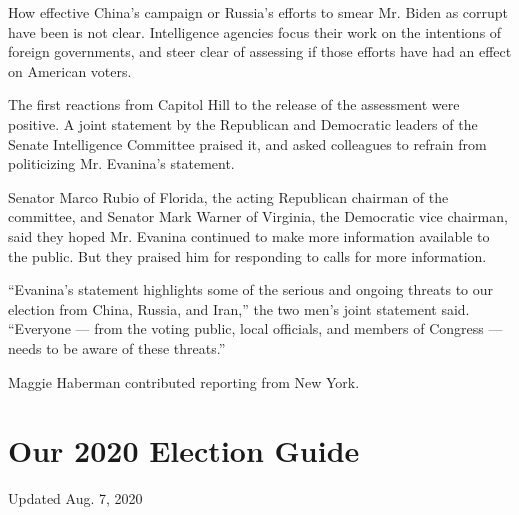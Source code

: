 How effective China's campaign or Russia's efforts to smear Mr. Biden as
corrupt have been is not clear. Intelligence agencies focus their work
on the intentions of foreign governments, and steer clear of assessing
if those efforts have had an effect on American voters.

The first reactions from Capitol Hill to the release of the assessment
were positive. A joint statement by the Republican and Democratic
leaders of the Senate Intelligence Committee praised it, and asked
colleagues to refrain from politicizing Mr. Evanina's statement.

Senator Marco Rubio of Florida, the acting Republican chairman of the
committee, and Senator Mark Warner of Virginia, the Democratic vice
chairman, said they hoped Mr. Evanina continued to make more information
available to the public. But they praised him for responding to calls
for more information.

``Evanina's statement highlights some of the serious and ongoing threats
to our election from China, Russia, and Iran,'' the two men's joint
statement said. ``Everyone --- from the voting public, local officials,
and members of Congress --- needs to be aware of these threats.''

Maggie Haberman contributed reporting from New York.

\hypertarget{our-2020-election-guide}{%
\section{Our 2020 Election Guide}\label{our-2020-election-guide}}

Updated Aug. 7, 2020

